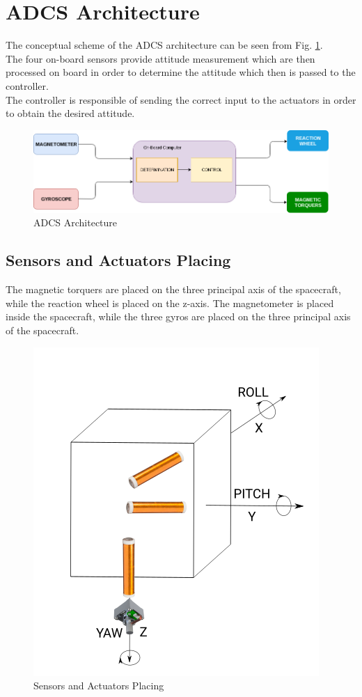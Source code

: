 \documentclass[11pt,a4paper]{report}
\begin{document}
\newpage

\section{ADCS Architecture}
The conceptual scheme of the ADCS architecture can be seen from Fig. \ref{fig:architecture}.\\
The four on-board sensors provide attitude measurement which are then processed on board in order to determine the attitude which then is passed to the controller.\\
The controller is responsible of sending the correct input to the actuators in order to obtain the desired attitude.

\begin{figure}[H]
 	\centering
 	\includegraphics[scale=0.5]{gfx/adcs.png}
    \caption{ADCS Architecture}
    \label{fig:architecture}
\end{figure}

\subsection{Sensors and Actuators Placing}
The magnetic torquers are placed on the three principal axis of the spacecraft, while the reaction wheel is placed on the z-axis. The magnetometer is placed inside the spacecraft, while the three gyros are placed on the three principal axis of the spacecraft.

\begin{figure}[H]
 	\centering
 	\includegraphics[scale=0.4]{gfx/actuators.png}
    \caption{Sensors and Actuators Placing}
\end{figure}
\end{document}
